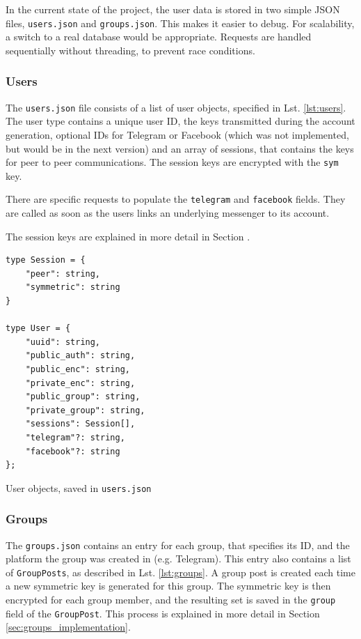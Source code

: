 \documentclass[a4paper, oneside]{discothesis}
\begin{document}
In the current state of the project, the user data is stored in two simple JSON files, \texttt{users.json} and \texttt{groups.json}. This makes it easier to debug. For scalability, a switch to a real database would be appropriate. Requests are handled sequentially without threading, to prevent race conditions.

\subsubsection{Users}

The \texttt{users.json} file consists of a list of user objects, specified in Lst. \ref{lst:users}. The user type contains a unique user ID, the keys transmitted during the account generation, optional IDs for Telegram or Facebook (which was not implemented, but would be in the next version) and an array of sessions, that contains the keys for peer to peer communications. The session keys are encrypted with the \texttt{sym} key.

There are specific requests to populate the \texttt{telegram} and \texttt{facebook} fields. They are called as soon as the users links an underlying messenger to its account.

The session keys are explained in more detail in Section \label{sec:p2p_implementation}.


\begin{listing}[h!]
\begin{verbatim}
type Session = {
    "peer": string,
    "symmetric": string
}

type User = {
    "uuid": string,
    "public_auth": string,
    "public_enc": string,
    "private_enc": string,
    "public_group": string,
    "private_group": string,
    "sessions": Session[],
    "telegram"?: string,
    "facebook"?: string
};
\end{verbatim}
\caption{User objects, saved in \texttt{users.json}}
\label{lst:users}
\end{listing}

\subsubsection{Groups}
\label{sec:group_keys}

The \texttt{groups.json} contains an entry for each group, that specifies its ID, and the platform the group was created in (e.g. Telegram). This entry also contains a list of \texttt{GroupPosts}, as described in Lst. \ref{lst:groups}. A group post is created each time a new symmetric key is generated for this group. The symmetric key is then encrypted for each group member, and the resulting set is saved in the \texttt{group} field of the \texttt{GroupPost}. This process is explained in more detail in Section \ref{sec:groups_implementation}.
\end{document}
